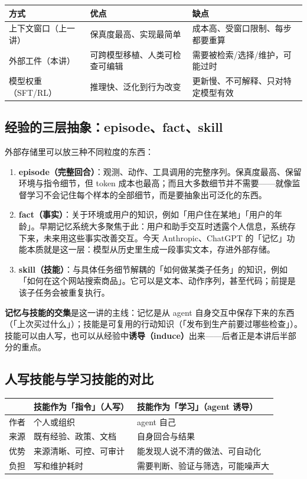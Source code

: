 ﻿\documentclass[a4paper]{article}
\begin{document}
\begin{center}
\begin{tabular}{p{2.6cm}p{4.4cm}p{5.2cm}}
\toprule
方式 & 优点 & 缺点 \\
\midrule
上下文窗口（上一讲） & 保真度最高、实现最简单 & 成本高、受窗口限制、每步都要重算 \\
外部工件（本讲） & 可跨模型移植、人类可检查可编辑 & 需要被检索/选择/维护，可能过时 \\
模型权重（SFT/RL） & 推理快、泛化到行为改变 & 更新慢、不可解释、只对特定模型有效 \\
\bottomrule
\end{tabular}
\end{center}

\subsection{经验的三层抽象：episode、fact、skill}

外部存储里可以放三种不同粒度的东西：

\begin{enumerate}
\item \textbf{episode（完整回合）}：观测、动作、工具调用的完整序列。保真度最高、保留环境与指令细节，但 token 成本也最高；而且大多数细节并不需要——就像监督学习不会记住每个样本的全部细节，而是要抽象出可泛化的东西。
\item \textbf{fact（事实）}：关于环境或用户的知识，例如「用户住在某地」「用户的年龄」。早期记忆系统大多聚焦于此：用户和助手交互时透露个人信息，系统存下来，未来用这些事实改善交互。今天 Anthropic、ChatGPT 的「记忆」功能本质就是这一层：模型从历史里生成一段事实文本，存进外部存储。
\item \textbf{skill（技能）}：与具体任务细节解耦的「如何做某类子任务」的知识，例如「如何在这个网站搜索商品」。它可以是文本、动作序列，甚至代码；前提是该子任务会被重复执行。
\end{enumerate}

\textbf{记忆与技能的交集}是这一讲的主线：记忆是从 agent 自身交互中保存下来的东西（「上次买过什么」）；技能是可复用的行动知识（「发布到生产前要过哪些检查」）。技能可以由人写，也可以从经验中\textbf{诱导（induce）}出来——后者正是本讲后半部分的重点。

\subsection{人写技能与学习技能的对比}

\begin{center}
\begin{tabular}{p{2.2cm}p{4.6cm}p{4.6cm}}
\toprule
 & 技能作为「指令」（人写） & 技能作为「学习」（agent 诱导） \\
\midrule
作者 & 个人或组织 & agent 自己 \\
来源 & 既有经验、政策、文档 & 自身回合与结果 \\
优势 & 来源清晰、可控、可审计 & 能发现人说不清的做法、可自动化 \\
负担 & 写和维护耗时 & 需要判断、验证与筛选，可能噪声大 \\
\bottomrule
\end{tabular}
\end{center}
\end{document}
